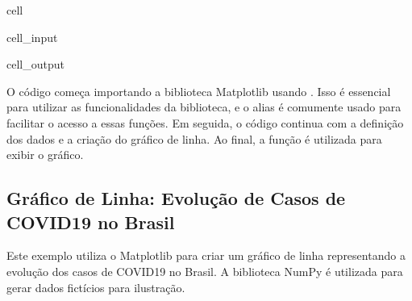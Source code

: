 \documentclass[letterpaper,10pt,english]{jupyterBook}
\begin{document}
\begin{sphinxuseclass}{cell}
\begin{sphinxVerbatimInput}
\begin{sphinxuseclass}{cell_input}
\begin{sphinxVerbatim}[commandchars=\\\{\}]
\end{sphinxVerbatim}

\end{sphinxuseclass}\end{sphinxVerbatimInput}
\begin{sphinxVerbatimOutput}

\begin{sphinxuseclass}{cell_output}
\noindent{}

\end{sphinxuseclass}\end{sphinxVerbatimOutput}

\end{sphinxuseclass}
\sphinxAtStartPar
O código começa importando a biblioteca Matplotlib usando . Isso é essencial para utilizar as funcionalidades da biblioteca, e o alias  é comumente usado para facilitar o acesso a essas funções. Em seguida, o código continua com a definição dos dados e a criação do gráfico de linha. Ao final, a função  é utilizada para exibir o gráfico.


\subsection{Gráfico de Linha: Evolução de Casos de COVID\sphinxhyphen{}19 no Brasil}
\label{\detokenize{chapters/ch7/ch7:grafico-de-linha-evolucao-de-casos-de-covid-19-no-brasil}}
\sphinxAtStartPar
Este exemplo utiliza o Matplotlib para criar um gráfico de linha representando a evolução dos casos de COVID\sphinxhyphen{}19 no Brasil. A biblioteca NumPy é utilizada para gerar dados fictícios para ilustração.
\end{document}
